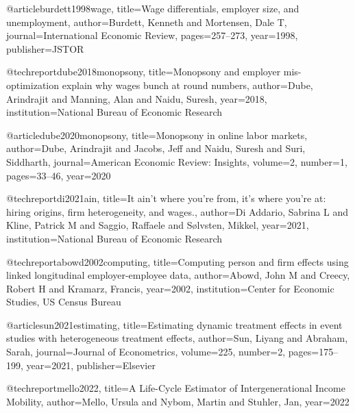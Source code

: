 @article{burdett1998wage,
  title={Wage differentials, employer size, and unemployment},
  author={Burdett, Kenneth and Mortensen, Dale T},
  journal={International Economic Review},
  pages={257--273},
  year={1998},
  publisher={JSTOR}
}

@techreport{dube2018monopsony,
  title={Monopsony and employer mis-optimization explain why wages bunch at round numbers},
  author={Dube, Arindrajit and Manning, Alan and Naidu, Suresh},
  year={2018},
  institution={National Bureau of Economic Research}
}

@article{dube2020monopsony,
  title={Monopsony in online labor markets},
  author={Dube, Arindrajit and Jacobs, Jeff and Naidu, Suresh and Suri, Siddharth},
  journal={American Economic Review: Insights},
  volume={2},
  number={1},
  pages={33--46},
  year={2020}
}

@techreport{di2021ain,
  title={It ain’t where you’re from, it’s where you’re at: hiring origins, firm heterogeneity, and wages.},
  author={Di Addario, Sabrina L and Kline, Patrick M and Saggio, Raffaele and S{\o}lvsten, Mikkel},
  year={2021},
  institution={National Bureau of Economic Research}
}

@techreport{abowd2002computing,
  title={Computing person and firm effects using linked longitudinal employer-employee data},
  author={Abowd, John M and Creecy, Robert H and Kramarz, Francis},
  year={2002},
  institution={Center for Economic Studies, US Census Bureau}
}

@article{sun2021estimating,
  title={Estimating dynamic treatment effects in event studies with heterogeneous treatment effects},
  author={Sun, Liyang and Abraham, Sarah},
  journal={Journal of Econometrics},
  volume={225},
  number={2},
  pages={175--199},
  year={2021},
  publisher={Elsevier}
}

@techreport{mello2022,
  title={A Life-Cycle Estimator of Intergenerational Income Mobility},
  author={Mello, Ursula and Nybom, Martin and Stuhler, Jan},
  year={2022}
 }